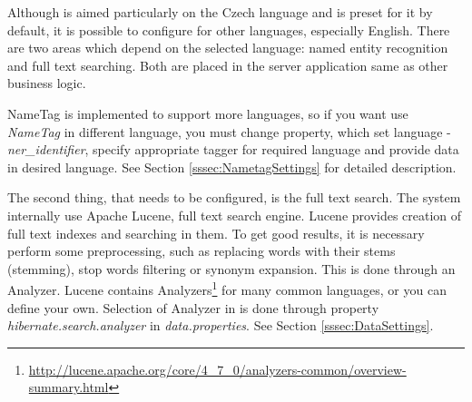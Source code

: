
Although \textan{} is aimed particularly on the Czech language and is preset for
it by default, it is possible to configure \textan{} for other languages, especially
English. There are two areas which depend on the selected language: named entity
recognition and full text searching. Both are placed in the server application
same as other business logic.

NameTag is implemented to support more languages, so if you want use {\it NameTag} in different language, you must change property, which set language  - {\it ner\_identifier},
specify appropriate tagger for required language and provide data in desired language.
See Section \ref{sssec:NametagSettings} for detailed description.

The second thing, that needs to be configured, is the full text search. The system
internally use Apache Lucene, full text search engine. Lucene provides creation
of full text indexes and searching in them. To get good results, it is necessary
perform some preprocessing, such as replacing words with their stems (stemming),
stop words filtering or synonym expansion. This is done through an Analyzer. Lucene
contains Analyzers\footnote{\url{http://lucene.apache.org/core/4_7_0/analyzers-common/overview-summary.html}}
for many common languages, or you can define your own. Selection of Analyzer in 
\textan{} is done through property \emph{hibernate.search.analyzer} in \emph{data.properties}.
See Section \ref{sssec:DataSettings}.


